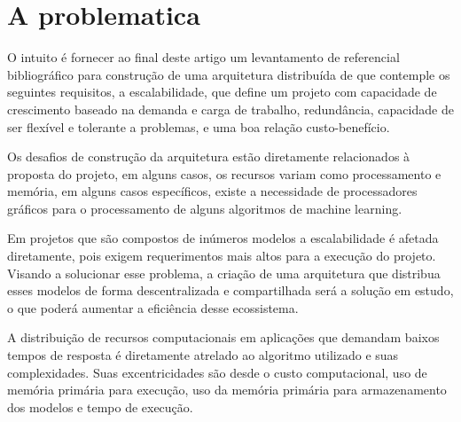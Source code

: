 \section{A problematica}
O intuito é fornecer ao final deste artigo um levantamento de referencial bibliográfico para construção de uma arquitetura distribuída de que contemple os seguintes requisitos, a escalabilidade, que define um projeto com capacidade de crescimento baseado na demanda e carga de trabalho, redundância, capacidade de ser flexível e tolerante a problemas, e uma boa relação custo-benefício.\par 
Os desafios de construção da arquitetura estão diretamente relacionados à proposta do projeto, em alguns casos, os recursos variam como processamento e memória, em alguns casos específicos, existe a necessidade de processadores gráficos para o processamento de alguns algoritmos de machine learning.\par
Em projetos que são compostos de inúmeros modelos a escalabilidade é afetada diretamente, pois exigem requerimentos mais altos para a execução do projeto. Visando a  solucionar esse problema, a criação de uma arquitetura que distribua esses modelos de forma descentralizada e compartilhada será a solução em estudo, o que poderá aumentar a eficiência desse ecossistema.\par
A distribuição de recursos computacionais em aplicações que demandam baixos tempos de resposta é diretamente atrelado ao algoritmo utilizado e suas complexidades. Suas excentricidades são desde o custo computacional, uso de memória primária para execução, uso da memória primária para armazenamento dos modelos  e tempo de execução.\par



\iffalse
\section{Objetivo geral}

Texto de exemplo

\begin{itemize}
	\item Item 1
	
	\item Item 2
	
	\item Item 3
	
\end{itemize}

\begin{citacao}
	MAqui voce tem um exemplo de citação de mais de 3 linhas, o conteúdo do texto deve ser escrito em fonte menor, sem espaçamento e com recuo de 4cm em relacao ao texto padrão do trabalho.
\end{citacao}
\fi